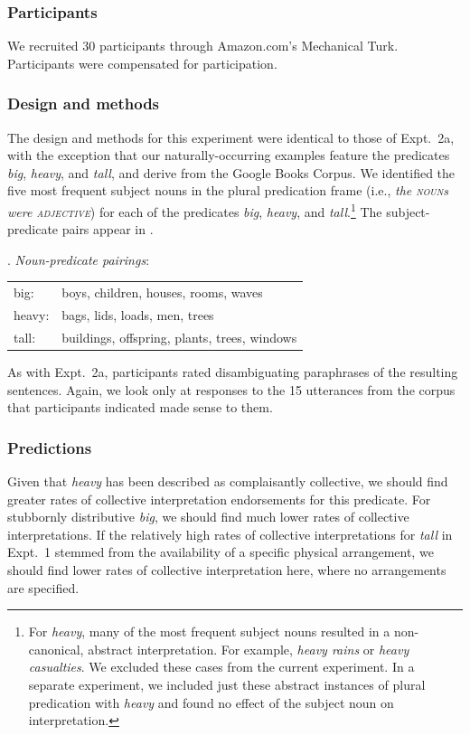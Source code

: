 \documentclass[linguex]{sp}
\begin{document}
\subsubsection{Participants}

We recruited 30 participants through Amazon.com's Mechanical Turk. Participants were compensated for participation.

\subsubsection{Design and methods}

The design and methods for this experiment were identical to those of Expt.~2a, with the exception that our naturally-occurring examples feature the predicates \emph{big}, \emph{heavy}, and \emph{tall}, and derive from the Google Books Corpus. We identified the five most frequent subject nouns in the plural predication frame (i.e., \emph{the \textsc{noun}s were \textsc{adjective}}) for each of the predicates \emph{big}, \emph{heavy}, and \emph{tall}.\footnote{For \emph{heavy}, many of the most frequent subject nouns resulted in a non-canonical, abstract interpretation. For example, \emph{heavy rains} or \emph{heavy casualties}. We excluded these cases from the current experiment. In a separate experiment, we included just these abstract instances of plural predication with \emph{heavy} and found no effect of the subject noun on interpretation.} The subject-predicate pairs appear in \Next.

\ex. \emph{Noun-predicate pairings}:\\[2pt]
\begin{tabular}{ll}
big:& boys, children, houses, rooms, waves\\
heavy:& bags, lids, loads, men, trees\\
tall:& buildings, offspring, plants, trees, windows
\end{tabular}	

As with Expt.~2a, participants rated disambiguating paraphrases of the resulting sentences. Again, we look only at responses to the 15 utterances from the corpus that participants indicated made sense to them.

\subsubsection{Predictions}

Given that \emph{heavy} has been described as complaisantly collective, we should find greater rates of collective interpretation endorsements for this predicate. For stubbornly distributive \emph{big}, we should find much lower rates of collective interpretations. If the relatively high rates of collective interpretations for \emph{tall} in Expt.~1 stemmed from the availability of a specific physical arrangement, we should find lower rates of collective interpretation here, where no arrangements are specified.
\end{document}
